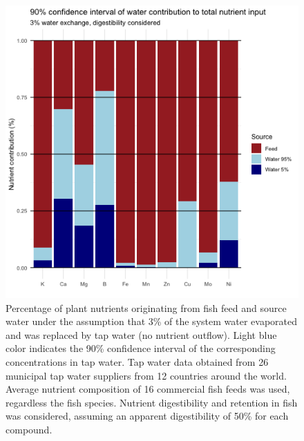 \documentclass{scrartcl}
\begin{document}
\begin{figure}
	\includegraphics{plots/nutrientContribution.png}
	\caption{Percentage of plant nutrients originating from fish feed and source water under the assumption that 3\% of the system water evaporated and was replaced by tap water (no nutrient outflow). Light blue color indicates the 90\% confidence interval of the corresponding concentrations in tap water. Tap water data obtained from 26 municipal tap water suppliers from 12 countries around the world. Average nutrient composition of 16 commercial fish feeds was used, regardless the fish species. Nutrient digestibility and retention in fish was considered, assuming an apparent digestibility of 50\% for each compound.}
	\label{fig2}
\end{figure}





	
\end{document}
